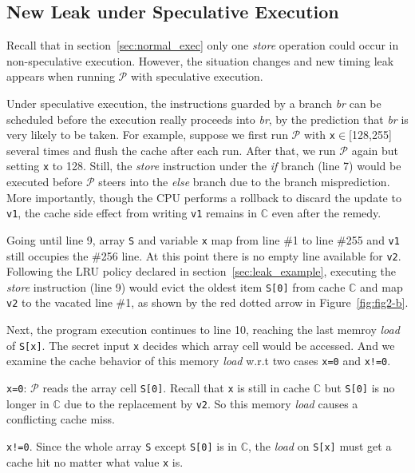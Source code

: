 \documentclass[sigconf, review]{acmart}
\newcommand{\prog}{\mathcal{P}}
\begin{document}
\subsection{New Leak under Speculative Execution}
\label{sec:specu_leak}

Recall that in section~\ref{sec:normal_exec} only one \textit{store} operation 
could occur in non-speculative execution. However, the situation changes and 
new timing leak appears when running $\prog$ with speculative execution.  


Under speculative execution, the instructions guarded by a branch \emph{br} 
can be scheduled before the execution really proceeds into \emph{br}, by the 
prediction that \emph{br} is very likely to be taken. For example, suppose 
we first run $\prog$ with \texttt{x}$\in$[128,255] several times and flush the 
cache after each run. After that, we run $\prog$ again but setting \texttt{x} 
to 128. Still, the \textit{store} instruction under the \emph{if} branch (line 
7) would be executed before $\prog$ steers into the \emph{else} branch due to 
the branch misprediction. More importantly, though the CPU performs a rollback 
to discard the update to \texttt{v1}, the cache side effect from writing 
\texttt{v1} remains in $\mathbb{C}$ even after the remedy. 


Going until line 9, array \texttt{S} and variable \texttt{x} map from line 
\#1 to line \#255 and \texttt{v1} still occupies the \#256 line. At this 
point there is no empty line available for \texttt{v2}. Following the LRU 
policy declared in section~\ref{sec:leak_example}, executing the \textit{store}
instruction (line 9) would evict the oldest item \texttt{S[0]} from cache 
$\mathbb{C}$ and map \texttt{v2} to the vacated line \#1, as shown by the red dotted
arrow in Figure~\ref{fig:fig2-b}.


Next, the program execution continues to line 10, reaching the last memroy 
\textit{load} of \texttt{S[x]}. The secret input \texttt{x} decides which 
array cell would be accessed. And we examine the cache behavior of this 
memory \textit{load} w.r.t two cases \texttt{x=0} and \texttt{x!=0}.


\begin{itemize*}
  \item \texttt{x=0}: $\prog$ reads the array cell \texttt{S[0]}. Recall that
    \texttt{x} is still in cache $\mathbb{C}$ but \texttt{S[0]} is no longer in 
		$\mathbb{C}$ due to the replacement by \texttt{v2}. So this memory \textit{load} 
		causes a conflicting cache miss.
  \item \texttt{x!=0}. Since the whole array \texttt{S} except \texttt{S[0]}
    is in $\mathbb{C}$, the \textit{load} on \texttt{S[x]} must get a cache hit no 
    matter what value \texttt{x} is.
\end{itemize*}
\end{document}
